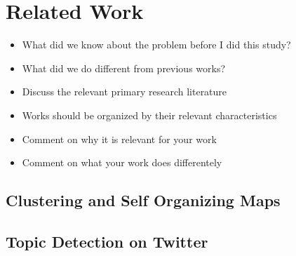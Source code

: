 \section{Related Work} %
\label{sec:related_work}

\begin{itemize}
  \item What did we know about the problem before I did this study? 
  \item What did we do different from previous works? 
  \item Discuss the relevant primary research literature 
  \item Works should be organized by their relevant characteristics 
  \item Comment on why it is relevant for your work 
  \item Comment on what your work does differentely 
\end{itemize}

\subsection{Clustering and Self Organizing Maps} %
\label{sub:self_organizing_maps}


\subsection{Topic Detection on Twitter} %
\label{sub:topic_detection_on_twitter}
